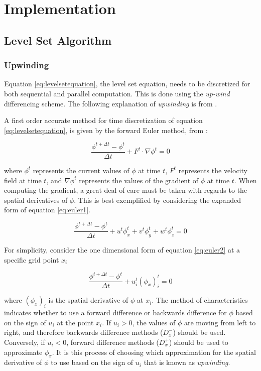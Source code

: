 \chapter{Implementation}

\section{Level Set Algorithm}\label{levelsetalgorithm}

\subsection{Upwinding}\label{upwinding}
Equation \eqref{eq:levelsetequation}, the level set equation, needs to be discretized for both sequential and parallel computation. This is done using the \textit{up-wind} differencing scheme. The following explanation of \textit{upwinding} is from \cite{osher2003lsm}.

A first order accurate method for time discretization of equation \eqref{eq:levelsetequation}, is given by the forward Euler method, from \cite{osher2003lsm}:

\begin{equation}
\frac{\phi^{t+\Delta t}-\phi^t}{\Delta t} +F^{t}\cdot{\nabla{\phi^{t}}} = 0
\label{eq:euler1}
\end{equation}

where $\phi^{t}$ represents the current values of $\phi$ at time $t$, $F^{t}$ represents the velocity field at time $t$, and  $\nabla{\phi^{t}}$ represents the values of the gradient of $\phi$ at time $t$. When computing the gradient, a great deal of care must be taken with regards to the spatial derivatives of $\phi$. This is best exemplified by considering the expanded form of equation \eqref{eq:euler1}.

\begin{equation}
\frac{\phi^{t+\Delta t}-\phi^t}{\Delta t} +u^{t}\phi_x^t+v^{t}\phi_y^t+w^{t}\phi_z^t = 0
\label{eq:euler2}
\end{equation}

For simplicity, consider the one dimensional form of equation \eqref{eq:euler2} at a specific grid point $x_i$ 

\begin{equation}
\frac{\phi^{t+\Delta t}-\phi^t}{\Delta t} +u_i^{t}(\phi_x)_i^t = 0
\label{eq:euler3}
\end{equation}

where $(\phi_x)_i$ is the spatial derivative of $\phi$ at $x_i$. The method of characteristics indicates whether to use a forward difference or backwards difference for $\phi$ based on the sign of $u_i$ at the point $x_i$. If $u_i > 0$, the values of $\phi$ are moving from left to right, and therefore backwards difference methods ($D_x^-$) should be used. Conversely, if $u_i<0$, forward difference methods ($D_x^+$) should be used to approximate $\phi_x$. It is this process of choosing which approximation for the spatial derivative of $\phi$ to use based on the sign of $u_i$ that is known as \textit{upwinding}. 

